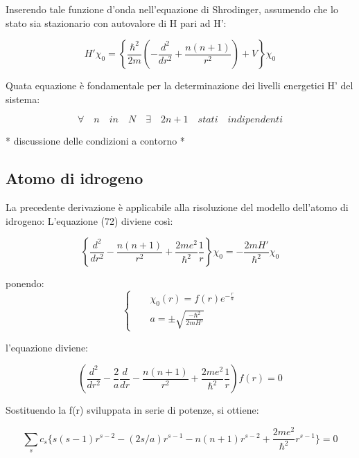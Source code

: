 \documentclass{article}
\begin{document}
Inserendo tale funzione d'onda nell'equazione di Shrodinger, assumendo che lo stato sia stazionario con autovalore di H pari ad H':

\begin{equation}
    H' \chi_0=\left\{\frac{\hbar^2}{2m}\left( -\frac{d^2}{dr^2}+\frac{n(n+1)}{r^2}\right)+V \right\}\chi_0
\end{equation}

Quata equazione è fondamentale per la determinazione dei livelli energetici H' del sistema:

\begin{equation}
    \forall \quad n \quad in \quad N \quad \exists \quad 2n+1 \quad stati \quad indipendenti
\end{equation}


* discussione delle condizioni a contorno *

\subsection{Atomo di idrogeno}
La precedente derivazione è applicabile alla risoluzione del modello dell'atomo di idrogeno:
L'equazione (72) diviene così:

\begin{equation}
    \left\{\frac{d^2}{dr^2} -\frac{n(n+1)}{r^2} +\frac{2me^2}{\hbar^2}\frac{1}{r} \right\}\chi_0= -\frac{2mH'}{\hbar^2}\chi_0
\end{equation}

ponendo:
\begin{equation}
    \left\{
    \begin{aligned}
         &  & \chi_0(r)=f(r)e^{-\frac{r}{a}}     \\
         &  & a=\pm \sqrt{\frac{-\hbar^2}{2mH'}}
    \end{aligned}
    \right.
\end{equation}

l'equazione diviene:

\begin{equation}
    \left(\frac{d^2}{dr^2} -\frac{2}{a}\frac{d}{dr} -\frac{n(n+1)}{r^2} +\frac{2me^2}{\hbar^2}\frac{1}{r}\right)f(r)=0
\end{equation}

Sostituendo la f(r) sviluppata in serie di potenze, si ottiene:

\begin{equation}
    \sum_{s} c_s \{s(s-1)r^{s-2}-(2s/a)r^{s-1}-n(n+1)r^{s-2}+\frac{2me^2}{\hbar^2}r^{s-1} \}=0
\end{equation}
\end{document}
